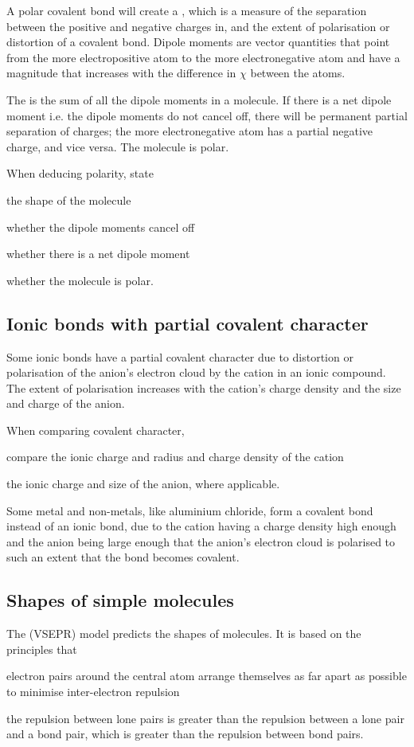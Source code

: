\documentclass[Chemistry.tex]{subfiles}
\begin{document}
A polar covalent bond will create a , which is a measure of the separation between the positive and negative charges in, and the extent of polarisation or distortion of a covalent bond. Dipole moments are vector quantities that point from the more electropositive atom to the more electronegative atom and have a magnitude that increases with the difference in \(\chi\) between the atoms.

The  is the sum of all the dipole moments in a molecule. If there is a net dipole moment i.e. the dipole moments do not cancel off, there will be permanent partial separation of charges; the more electronegative atom has a partial negative charge, and vice versa. The molecule is polar.

When deducing polarity, state
\begin{slinenum}\item the shape of the molecule
\item whether the dipole moments cancel off
\item whether there is a net dipole moment
\item whether the molecule is polar.
\end{slinenum}
\subsection{Ionic bonds with partial covalent character}
Some ionic bonds have a partial covalent character due to distortion or polarisation of the anion's electron cloud by the cation in an ionic compound. The extent of polarisation increases with the cation's charge density and the size and charge of the anion.

When comparing covalent character,
\begin{slinenum}
\item compare the ionic charge and radius and charge density of the cation
\item the ionic charge and size of the anion, where applicable.
\end{slinenum}

Some metal and non-metals, like aluminium chloride, form a covalent bond instead of an ionic bond, due to the cation having a charge density high enough and the anion being large enough that the anion's electron cloud is polarised to such an extent that the bond becomes covalent.
\subsection{Shapes of simple molecules}
The  (VSEPR) model predicts the shapes of molecules. It is based on the principles that \begin{slinenum}
\item electron pairs around the central atom arrange themselves as far apart as possible to minimise inter-electron repulsion
\item the repulsion between lone pairs is greater than the repulsion between a lone pair and a bond pair, which is greater than the repulsion between bond pairs.\end{slinenum}
\end{document}
